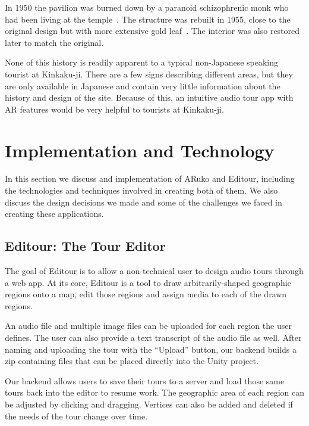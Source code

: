 \documentclass[a4paper, 10pt, american, titlepage]{article}
\begin{document}
In 1950 the pavilion was burned down by a paranoid schizophrenic monk who had
been living at the temple~\autocite{borowitz2005}. The structure was rebuilt in
1955, close to the original design but with more extensive gold
leaf~\autocite{bornoff2000}. The interior was also restored later to match the
original.

None of this history is readily apparent to a typical non-Japanese speaking
tourist at Kinkaku-ji. There are a few signs describing different areas, but
they are only available in Japanese and contain very little information about
the history and design of the site. Because of this, an intuitive audio tour app
with AR features would be very helpful to tourists at Kinkaku-ji.

\clearpage

\section{Implementation and Technology}
\label{sec:implementationAndTechnology}

In this section we discuss and implementation of ARuko and Editour, including
the technologies and techniques involved in creating both of them. We also
discuss the design decisions we made and some of the challenges we faced in
creating these applications.

\subsection{Editour: The Tour Editor}
\label{sec:editour}

The goal of Editour is to allow a non-technical user to design audio tours
through a web app. At its core, Editour is a tool to draw arbitrarily-shaped
geographic regions onto a map, edit those regions and assign media to each of
the drawn regions.

An audio file and multiple image files can be uploaded for each region the user
defines. The user can also provide a text transcript of the audio file as well.
After naming and uploading the tour with the ``Upload'' button, our backend
builds a zip containing files that can be placed directly into the Unity
project.

Our backend allows users to save their tours to a server and load those same
tours back into the editor to resume work. The geographic area of each region
can be adjusted by clicking and dragging. Vertices can also be added and
deleted if the needs of the tour change over time.
\end{document}

